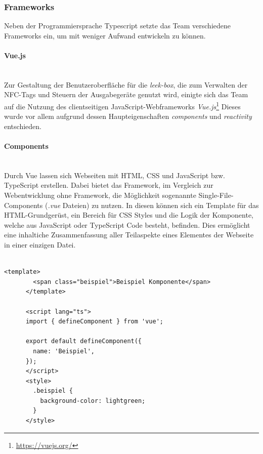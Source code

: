 \documentclass[10pt, a4paper]{article}
\begin{document}
\begin{onehalfspace}
  \subsubsection{Frameworks}
  Neben der Programmiersprache Typescript setzte das Team verschiedene Frameworks ein, um mit weniger Aufwand entwickeln zu können.

  \paragraph*{Vue.js} $~$ \\
  Zur Gestaltung der Benutzeroberfläche für die \textit{leek-box}, die zum Verwalten der NFC-Tags und Steuern der Ausgabegeräte genutzt wird, einigte sich das Team auf die Nutzung des
  clientseitigen JavaScript-Webframeworks \textit{Vue.js}\footnote{\raggedright\url{https://vuejs.org/}}
  Dieses wurde vor allem aufgrund dessen Haupteigenschaften \textit{components} und \textit{reactivity} entschieden.

  \paragraph*{Components} $~$ \\
  Durch Vue lassen sich Webseiten mit HTML, CSS und JavaScript bzw. TypeScript erstellen. Dabei bietet das Framework, im Vergleich zur Webentwicklung ohne Framework, die Möglichkeit sogenannte Single-File-Components (\textit{.vue} Dateien) zu nutzen. In diesen können sich ein Template für das HTML-Grundgerüst, ein Bereich für CSS Styles und die Logik der Komponente, welche aus JavaScript oder TypeScript Code besteht, befinden. Dies ermöglicht eine inhaltiche Zusammenfassung aller Teilaspekte eines Elementes der Webseite in einer einzigen Datei.
  \\~\\
  \begin{minipage}{\textwidth}
    \begin{lstlisting}[caption={Beispiel einer simplen \textit{vue component}-Datei}, captionpos=b, label=lst:EinfacheComponent]
      <template>
        <span class="beispiel">Beispiel Komponente</span>
      </template>

      <script lang="ts">
      import { defineComponent } from 'vue';

      export default defineComponent({
        name: 'Beispiel',
      });
      </script>
      <style>
        .beispiel {
          background-color: lightgreen;
        }
      </style>
    \end{lstlisting}
  \end{minipage}


\end{onehalfspace}
\end{document}
